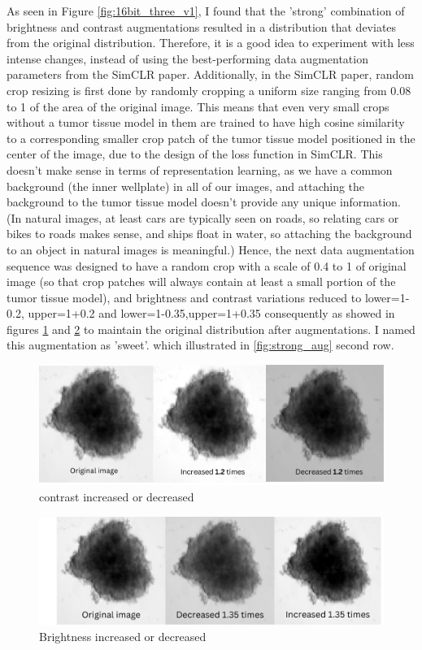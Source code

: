   As seen in Figure \ref{fig:16bit_three_v1}, I found that the 'strong' combination of brightness and contrast augmentations resulted in a distribution that deviates from the original distribution. Therefore, it is a good idea to experiment with less intense changes, instead of using the best-performing data augmentation parameters from the SimCLR paper. Additionally, in the SimCLR paper, random crop resizing is first done by randomly cropping a uniform size ranging from 0.08 to 1 of the area of the original image. This means that even very small crops without a tumor tissue model in them are trained to have high cosine similarity to a corresponding smaller crop patch of the tumor tissue model positioned in the center of the image, due to the design of the loss function in SimCLR. This doesn't make sense in terms of representation learning, as we have a common background (the inner wellplate) in all of our images, and attaching the background to the tumor tissue model doesn't provide any unique information. (In natural images, at least cars are typically seen on roads, so relating cars or bikes to roads makes sense, and ships float in water, so attaching the background to an object in natural images is meaningful.) Hence, the next data augmentation sequence was designed to have a random crop with a scale of 0.4 to 1 of original image (so that crop patches will always contain at least a small portion of the tumor tissue model), and brightness and contrast variations reduced to lower=1-0.2, upper=1+0.2 and lower=1-0.35,upper=1+0.35 consequently as showed in figures  \ref{fig:bright} and  \ref{fig:contra} to maintain the original distribution after augmentations. I named this augmentation as 'sweet'. which illustrated in \ref{fig:strong_aug} second row.

  \begin{figure}[H]
    \centering
    \includegraphics[scale=0.4]{figures/bright.png} 
    \caption{contrast increased or decreased}
    \label{fig:bright}
  \end{figure}

  \begin{figure}[H]
    \centering
    \includegraphics[scale=0.5]{figures/contra.png} 
    \caption{Brightness increased or decreased}
    \label{fig:contra}
  \end{figure}

